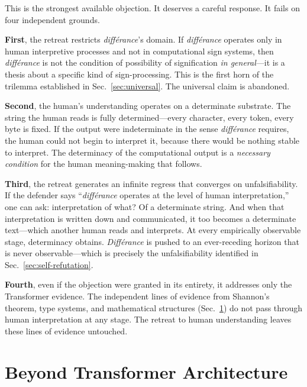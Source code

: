 \documentclass[a4paper,twocolumn,11pt]{article}
\begin{document}
This is the strongest available objection. It deserves a careful response. It fails on four independent grounds.

\textbf{First}, the retreat restricts \emph{diff\'erance}'s domain. If \emph{diff\'erance} operates only in human interpretive processes and not in computational sign systems, then \emph{diff\'erance} is not the condition of possibility of signification \emph{in general}---it is a thesis about a specific kind of sign-processing. This is the first horn of the trilemma established in Sec.~\ref{sec:universal}. The universal claim is abandoned.

\textbf{Second}, the human's understanding operates on a determinate substrate. The string the human reads is fully determined---every character, every token, every byte is fixed. If the output were indeterminate in the sense \emph{diff\'erance} requires, the human could not begin to interpret it, because there would be nothing stable to interpret. The determinacy of the computational output is a \emph{necessary condition} for the human meaning-making that follows.

\textbf{Third}, the retreat generates an infinite regress that converges on unfalsifiability. If the defender says ``\emph{diff\'erance} operates at the level of human interpretation,'' one can ask: interpretation of what? Of a determinate string. And when that interpretation is written down and communicated, it too becomes a determinate text---which another human reads and interprets. At every empirically observable stage, determinacy obtains. \emph{Diff\'erance} is pushed to an ever-receding horizon that is never observable---which is precisely the unfalsifiability identified in Sec.~\ref{sec:self-refutation}.

\textbf{Fourth}, even if the objection were granted in its entirety, it addresses only the Transformer evidence. The independent lines of evidence from Shannon's theorem, type systems, and mathematical structures (Sec.~\ref{sec:beyond}) do not pass through human interpretation at any stage. The retreat to human understanding leaves these lines of evidence untouched.



\section{Beyond Transformer Architecture}
\label{sec:beyond}
\end{document}
